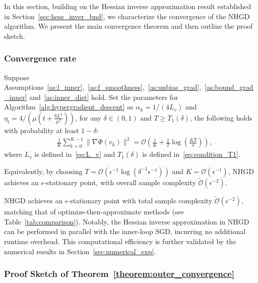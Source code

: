 \documentclass[11 pt]{article}
\begin{document}
In this section, building on the Hessian inverse approximation result established in Section~\ref{sec:hess_inver_bnd}, we characterize the convergence of the NHGD algorithm.  We present the main convergence theorem and then outline the proof sketch.

\subsubsection{Convergence rate}

\begin{theorem}\label{theorem:outer_convergence}
    Suppose Assumptions~\ref{as:l_inner},~\ref{as:f_smoothness},~\ref{as:unbias_grad},~\ref{as:bound_grad_inner}  and~\ref{as:inner_dist} hold. Set the parameters for Algorithm~\ref{alg:hypergradient_descent} as $\alpha_k = 1/(4L_v)$ and $\eta_t=4/(\mu(t+\frac{8L^2}{\mu^2}))$, for any $\delta\in(0,1)$ and $T\geq T_1(\delta)$,
the following holds with probability at least $1-\delta$:
\begin{align*}
    \quad \frac{1}{K} \sum_{k=0}^{K-1} \| \nabla \Phi(v_k) \|^2 = \mathcal{O}\left(\frac{1}{K}+\frac{1}{T}\log\left(\frac{KT}{\delta}\right) \right),
\end{align*}
where $L_v$ is defined in~\eqref{eq:L_v} and $T_1(\delta)$ is defined in~\eqref{eq:condition_T1}.

Equivalently, by choosing $T = \mathcal{O}(\epsilon^{-1}\log(\delta^{-1}\epsilon^{-1}))$ and
$K = \mathcal{O}(\epsilon^{-1})$, NHGD achieves an $\epsilon$-stationary point, with overall sample complexity $\tilde{\mathcal{O}}(\epsilon^{-2})$.
\end{theorem}
\begin{remark}
NHGD achieves an $\epsilon$-stationary point with total sample complexity $\tilde{\mathcal{O}}(\epsilon^{-2})$, matching that of optimize-then-approximate methods (see Table~\ref{tab:comparison}). 
Notably, the Hessian inverse approximation in NHGD can be performed in parallel with the inner-loop SGD, incurring no additional runtime overhead. 
This computational efficiency is further validated by the numerical results in Section~\ref{sec:numerical_exp}.
\end{remark}



\subsubsection{Proof Sketch of Theorem~\ref{theorem:outer_convergence}}
\end{document}
